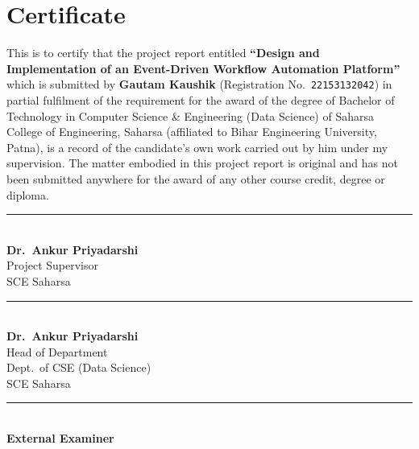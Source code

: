 \documentclass[12pt, a4paper, oneside]{report}
\begin{document}
\chapter*{Certificate}
\thispagestyle{plain}
{

This is to certify that the project report entitled \textbf{``Design and Implementation of an Event-Driven Workflow Automation Platform''} which is submitted by \textbf{Gautam Kaushik} (Registration No.\ \texttt{22153132042}) in partial fulfilment of the requirement for the award of the degree of Bachelor of Technology in Computer Science \& Engineering (Data Science) of Saharsa College of Engineering, Saharsa (affiliated to Bihar Engineering University, Patna), is a record of the candidate's own work carried out by him under my supervision. The matter embodied in this project report is original and has not been submitted anywhere for the award of any other course credit, degree or diploma.

\vspace{1.2cm}

\noindent
\begin{minipage}[t]{0.32\textwidth}
\centering
\rule{4cm}{0.4pt} \\
\textbf{Dr.\ Ankur Priyadarshi} \\
Project Supervisor \\
SCE Saharsa
\end{minipage}
\hfill
\begin{minipage}[t]{0.32\textwidth}
\centering
\rule{4cm}{0.4pt} \\
\textbf{Dr.\ Ankur Priyadarshi} \\
Head of Department \\
Dept.\ of CSE (Data Science) \\
SCE Saharsa
\end{minipage}
\hfill
\begin{minipage}[t]{0.32\textwidth}
\centering
\rule{4cm}{0.4pt} \\
\textbf{External Examiner}
\end{minipage}
}%

\clearpage

\end{document}
